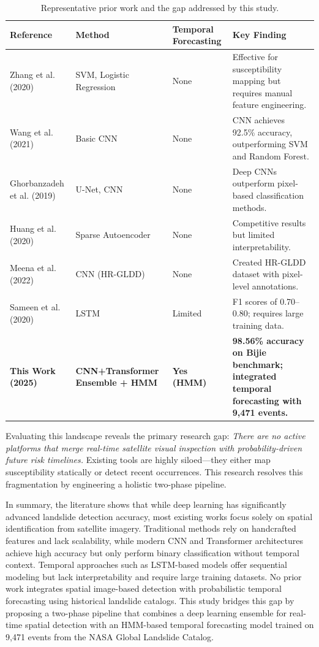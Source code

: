 \documentclass[12pt,a4paper]{report}
\begin{document}
\begin{table}[H]
\begin{center}
\caption{Representative prior work and the gap addressed by this study.}\label{tab:litcompare}
\renewcommand{\arraystretch}{1.2}
\begin{tabular}{p{3.2cm}p{2.5cm}p{2.8cm}p{4.5cm}}
\hline
\textbf{Reference} & \textbf{Method} & \textbf{Temporal Forecasting} & \textbf{Key Finding} \\
\hline
Zhang et al. (2020) \cite{zhang2020landslide_review} & SVM, Logistic Regression & None & Effective for susceptibility mapping but requires manual feature engineering. \\
Wang et al. (2021) \cite{wang2021landslide} & Basic CNN & None & CNN achieves 92.5\% accuracy, outperforming SVM and Random Forest. \\
Ghorbanzadeh et al. (2019) \cite{ghorbanzadeh2019unet} & U-Net, CNN & None & Deep CNNs outperform pixel-based classification methods. \\
Huang et al. (2020) \cite{huang2020landslide_dl} & Sparse Autoencoder & None & Competitive results but limited interpretability. \\
Meena et al. (2022) \cite{meena2022hrgldd} & CNN (HR-GLDD) & None & Created HR-GLDD dataset with pixel-level annotations. \\
Sameen et al. (2020) \cite{sameen2020lstm} & LSTM & Limited & F1 scores of 0.70--0.80; requires large training data. \\
\hline
\textbf{This Work (2025)} & \textbf{CNN+Transformer Ensemble + HMM} & \textbf{Yes (HMM)} & \textbf{98.56\% accuracy on Bijie benchmark; integrated temporal forecasting with 9,471 events.} \\
\hline
\end{tabular}
\end{center}
\end{table}

Evaluating this landscape reveals the primary research gap: \textit{There are no active platforms that merge real-time satellite visual inspection with probability-driven future risk timelines.} Existing tools are highly siloed—they either map susceptibility statically or detect recent occurrences. This research resolves this fragmentation by engineering a holistic two-phase pipeline.

In summary, the literature shows that while deep learning has significantly advanced landslide detection accuracy, most existing works focus solely on spatial identification from satellite imagery. Traditional methods rely on handcrafted features and lack scalability, while modern CNN and Transformer architectures achieve high accuracy but only perform binary classification without temporal context. Temporal approaches such as LSTM-based models offer sequential modeling but lack interpretability and require large training datasets. No prior work integrates spatial image-based detection with probabilistic temporal forecasting using historical landslide catalogs. This study bridges this gap by proposing a two-phase pipeline that combines a deep learning ensemble for real-time spatial detection with an HMM-based temporal forecasting model trained on 9,471 events from the NASA Global Landslide Catalog.
\end{document}
